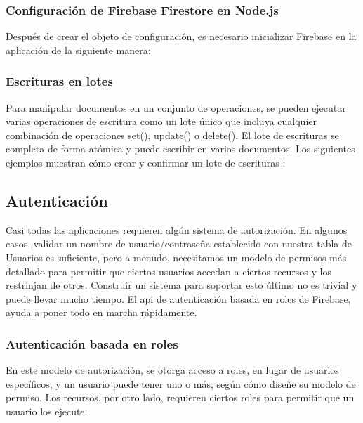 \newpage
\subsubsection{Configuración de Firebase Firestore en Node.js}
Después de crear el objeto de configuración, es necesario inicializar Firebase en la aplicación de la siguiente manera:
\vspace{0.8cm}



\subsubsection{Escrituras en lotes}
Para manipular documentos en un conjunto de operaciones, se pueden ejecutar varias operaciones de escritura como un lote único que incluya cualquier combinación de operaciones set(), update() o delete(). El lote de escrituras se completa de forma atómica y puede escribir en varios documentos. Los siguientes ejemplos muestran cómo crear y confirmar un lote de escrituras \cite{transactions}:
\vspace{0.8cm}




\subsection{Autenticación}
Casi todas las aplicaciones requieren algún sistema de autorización. En algunos casos, validar un nombre de usuario/contraseña establecido con nuestra tabla de Usuarios es suficiente, pero a menudo, necesitamos un modelo de permisos más detallado para permitir que ciertos usuarios accedan a ciertos recursos y los restrinjan de otros. Construir un sistema para soportar esto último no es trivial y puede llevar mucho tiempo. El \acrshort{api} de autenticación basada en roles de Firebase, ayuda a poner todo en marcha rápidamente.

\subsubsection{Autenticación basada en roles}
En este modelo de autorización, se otorga acceso a roles, en lugar de usuarios específicos, y un usuario puede tener uno o más, según cómo diseñe su modelo de permiso. Los recursos, por otro lado, requieren ciertos roles para permitir que un usuario los ejecute.
\vspace{0.8cm}

